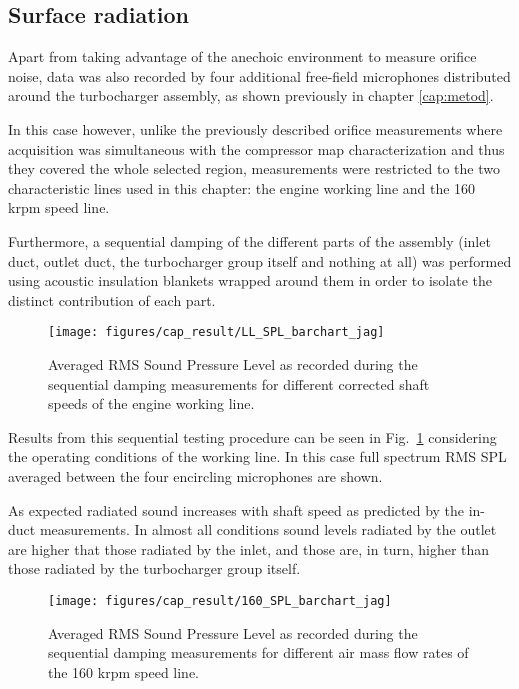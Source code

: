 \subsection{Surface radiation}

Apart from taking advantage of the anechoic environment to measure orifice noise, data was also recorded by four additional free-field microphones distributed around the turbocharger assembly, as shown previously in chapter \ref{cap:metod}.

In this case however, unlike the previously described orifice measurements where acquisition was simultaneous with the compressor map characterization and thus they covered the whole selected region, measurements were restricted to the two characteristic lines used in this chapter: the engine working line and the 160 krpm speed line.

Furthermore, a sequential damping of the different parts of the assembly (inlet duct, outlet duct, the turbocharger group itself and nothing at all) was performed using acoustic insulation blankets wrapped around them in order to isolate the distinct contribution of each part. 

\begin{figure}[tbh!]
\centering
\texttt{[image: figures/cap\_result/LL\_SPL\_barchart\_jag]}
\caption{Averaged RMS Sound Pressure Level as recorded during the sequential damping measurements for different corrected shaft speeds of the engine working line.}
\label{fig:result_spl_radiated_comp_bar_LL}
\end{figure}

Results from this sequential testing procedure can be seen in Fig.~\ref{fig:result_spl_radiated_comp_bar_LL} considering the operating conditions of the working line. In this case full spectrum RMS SPL averaged between the four encircling microphones are shown. 

As expected radiated sound increases with shaft speed as predicted by the in-duct measurements. In almost all conditions sound levels radiated by the outlet are higher that those radiated by the inlet, and those are, in turn, higher than those radiated by the turbocharger group itself.

\begin{figure}[tbh!]
\centering
\texttt{[image: figures/cap\_result/160\_SPL\_barchart\_jag]}
\caption{Averaged RMS Sound Pressure Level as recorded during the sequential damping measurements for different air mass flow rates of the 160 krpm speed line.}
\label{fig:result_spl_radiated_comp_bar_160}
\end{figure}

